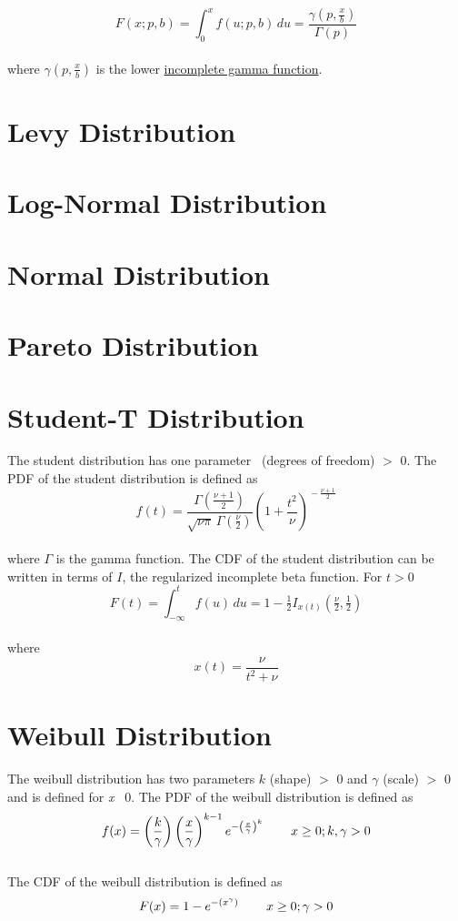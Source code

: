 		$$F(x;p,b) = \int_0^x f(u;p,b)\,du = \frac{\gamma\left(p, \frac{x}{b}\right)}{\Gamma(p)}$$
		\\[0.3cm]
		where $\gamma\left(p, \frac{x}{b}\right)$ is the lower \href{https://en.wikipedia.org/wiki/Incomplete_gamma_function}{incomplete gamma function}.

	\section{Levy Distribution}

	\section{Log-Normal Distribution}

	\section{Normal Distribution}

	\section{Pareto Distribution}

	\section{Student-T Distribution}
	
		The student distribution has one parameter \nu\ (degrees of freedom) $>$ 0. The \ac{PDF} of the student distribution is defined as
		\\
		$$f(t) = \frac{\Gamma(\frac{\nu+1}{2})} {\sqrt{\nu\pi}\,\Gamma(\frac{\nu}{2})} \left(1+\frac{t^2}{\nu} \right)^{\!-\frac{\nu+1}{2}}$$
		\\
		where $\Gamma$ is the gamma function. The \ac{CDF} of the student distribution can be written in terms of $I$, the regularized incomplete beta function. For $t > 0$
		\\
		$$F(t) = \int_{-\infty}^t f(u)\,du = 1 - \tfrac{1}{2} I_{x(t)}\left(\tfrac{\nu}{2}, \tfrac{1}{2}\right)$$
		\\
		where $$x(t) = \frac{\nu}{{t^2+\nu}}$$

	\section{Weibull Distribution}
	
		The weibull distribution has two parameters $k$ (shape) $>$ 0 and $\gamma$ (scale) $>$ 0 and is defined for \textit{x} \geq\ 0. The \ac{PDF} of the weibull distribution is defined as
		\\
		$$f(x) = \left(\frac{k}{\gamma}\right)\left(\frac{x}{\gamma}\right)^{k-1}e^{-\left(\frac{x}{\gamma}\right)^{k}} \hspace{.3in} x \geq 0; k,\gamma > 0\\$$
		\\
		The \ac{CDF} of the weibull distribution is defined as
		\\
		$$F(x) = 1 - e^{-(x^{\gamma})} \hspace{.3in} x \geq 0; \gamma > 0$$
